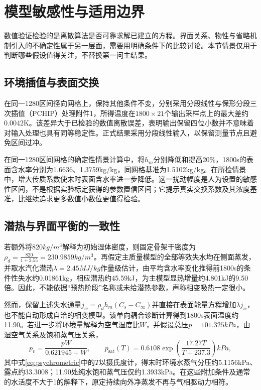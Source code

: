 \section{模型敏感性与适用边界}
数值验证检验的是离散算法是否可靠求解已建立的方程。界面关系、物性与省略机制引入的不确定性属于另一层面，需要用明确条件下的比较讨论。本节情景仅用于判断哪些假设值得关注，不替换第一问主结果。

\subsection{环境插值与表面交换}
在同一1280区间径向网格上，保持其他条件不变，分别采用分段线性与保形分段三次插值（PCHIP）处理附件1，所得温度在$1800\times21$个输出采样点上的最大差约0.0042\unit{K}。该差异大于已检验的数值离散误差，表明输出保留四位小数并不意味着对输入处理也具有同等稳定性。正式结果采用分段线性输入，以保留测量节点且避免区间过冲。

在同一1280区间网格的确定性情景计算中，将$h_m$分别降低和提高20\%，1800\unit{s}的表面含水率分别为1.6636、1.3759\unit{kg/kg}，同网格基准为1.5102\unit{kg/kg}。在所检情景中，增大传质系数使末时表面含水率进一步降低。这一扰动幅度是人为设置的敏感性区间，不是根据实验标定获得的参数置信区间；它提示真实交换系数及其浓度基准，比继续追求更多数值小数位更值得检验。

\subsection{潜热与界面平衡的一致性}
若额外将$820\unit{kg/m^3}$解释为初始湿体密度，则固定骨架干密度为$\rho_d=\frac{820}{1+2.55}=230.9859\unit{kg/m^3}$。再假定主质量模型的全部等效失水均在侧面蒸发，并取水汽化潜热$\lambda=2.45\unit{MJ/kg}$作量级估计\cite{fao}，由平均含水率变化推得前1800\unit{s}的条件性失水约0.01861\unit{kg}，相应潜热约45.59\unit{kJ}，为主模型显热增量约4.801\unit{kJ}的9.50倍。因此，不能依据“预热阶段”名称或未给潜热参数，声称相变吸热一定很小。

然而，保留上述失水通量$j_w=\rho_d h_m(C_s-C_\infty)$并直接在表面能量方程增加$\lambda j_w$，也不能自动形成自洽的相变模型。该单向耦合诊断计算得到1800\unit{s}表面温度约11.90\celsius。若进一步将环境量解释为空气湿度比$W$，并假设总压$p=101.325\unit{kPa}$，由湿空气关系\cite{ashrae}及饱和蒸气压关系\cite{fao}，
\begin{equation}
p_v=\frac{pW}{0.621945+W},\qquad
p_{\mathrm{sat}}(T)=0.6108\exp\!\left(\frac{17.27T}{T+237.3}\right)\unit{kPa},
\label{eq:psychrometric}
\end{equation}
其中式\eqref{eq:psychrometric}中的$T$以摄氏度计，得末时环境水蒸气分压约5.1156\unit{kPa}、露点约33.3008\celsius；11.90\celsius{}处纯水饱和蒸气压仅约1.3933\unit{kPa}。在这些附加条件及通常的水活度不大于1的解释下，原定持续向外净蒸发不再与气相驱动力相符。

